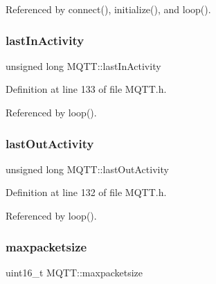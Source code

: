 Referenced by connect(), initialize(), and loop().

\mbox{\label{class_m_q_t_t_a0a5d8f29e0e75772e0a85b109fa77a04}} 
\subsubsection{\texorpdfstring{last\+In\+Activity}{lastInActivity}}
{\footnotesize\ttfamily unsigned long M\+Q\+T\+T\+::last\+In\+Activity\hspace{0.3cm}{\ttfamily [private]}}



Definition at line 133 of file M\+Q\+T\+T.\+h.



Referenced by loop().

\mbox{\label{class_m_q_t_t_a58a1c0a26b1de2522b79627b224bf1f6}} 
\subsubsection{\texorpdfstring{last\+Out\+Activity}{lastOutActivity}}
{\footnotesize\ttfamily unsigned long M\+Q\+T\+T\+::last\+Out\+Activity\hspace{0.3cm}{\ttfamily [private]}}



Definition at line 132 of file M\+Q\+T\+T.\+h.



Referenced by loop().

\mbox{\label{class_m_q_t_t_aac8cf32807b542ce45a9060d9769f35e}} 
\subsubsection{\texorpdfstring{maxpacketsize}{maxpacketsize}}
{\footnotesize\ttfamily uint16\+\_\+t M\+Q\+T\+T\+::maxpacketsize\hspace{0.3cm}{\ttfamily [private]}}



